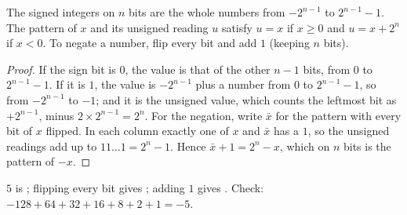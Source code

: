 \label{lst:g10:machine-integers:twos}

\label{out:g10:machine-integers:twos}

\begin{proposition}\label{prop:g10:machine-integers:negation}
The signed integers on $n$ bits are the whole numbers from $-2^{n-1}$ to $2^{n-1} - 1$. The pattern of $x$ and its
unsigned reading $u$ satisfy $u = x$ if $x \ge 0$ and $u = x + 2^n$ if $x < 0$. To negate a number, flip every bit and
add $1$ (keeping $n$ bits).
\end{proposition}

\begin{proof}
If the sign bit is $0$, the value is that of the other $n - 1$ bits, from $0$ to $2^{n-1} - 1$. If it is $1$, the
value is $-2^{n-1}$ plus a number from $0$ to $2^{n-1} - 1$, so from $-2^{n-1}$ to $-1$; and it is the unsigned
value, which counts the leftmost bit as $+2^{n-1}$, minus $2 \times 2^{n-1} = 2^n$. For the negation, write $\bar x$
for the pattern with every bit of $x$ flipped. In each column exactly one of $x$ and $\bar x$ has a $1$, so the
unsigned readings add up to $11\dots1 = 2^n - 1$. Hence $\bar x + 1 = 2^n - x$, which on $n$ bits is the pattern of
$-x$.
\end{proof}

\begin{example}\label{ex:g10:machine-integers:minus-five}
$5$ is ; flipping every bit gives ; adding $1$ gives . Check:
$-128 + 64 + 32 + 16 + 8 + 2 + 1 = -5$.
\end{example}

